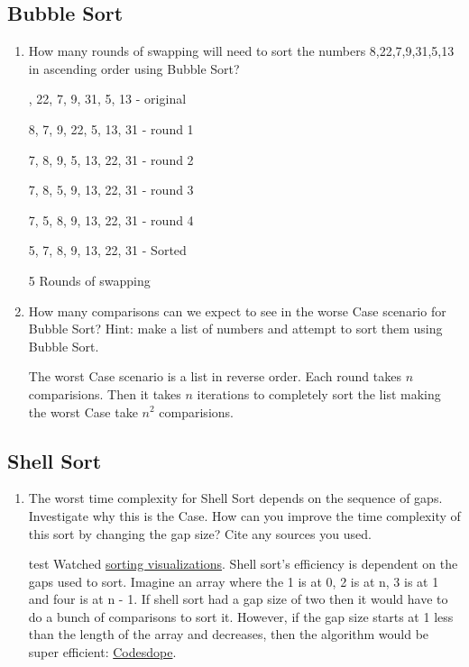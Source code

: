 \documentclass[12pt]{article}
\newenvironment{QandA}{\begin{enumerate}[label=\bfseries\alph*.]\bfseries}
{\end{enumerate}}
\newenvironment{answered}{\par\normalfont}{}
\begin{document}
    \subsection{Bubble Sort}
    \begin{QandA}

    \item How many rounds of swapping will need to sort the numbers 8,22,7,9,31,5,13 in ascending order using Bubble Sort?
        \begin{answered}
            8, 22, 7, 9, 31, 5, 13 - original

            8, 7, 9, 22, 5, 13, 31 - round 1

            7, 8, 9, 5, 13, 22, 31 - round 2

            7, 8, 5, 9, 13, 22, 31 - round 3

            7, 5, 8, 9, 13, 22, 31 - round 4

            5, 7, 8, 9, 13, 22, 31 - Sorted

            5 Rounds of swapping
        \end{answered}

    \item How many comparisons can we expect to see in the worse Case scenario for Bubble Sort? Hint: make a list of numbers and attempt to sort them using Bubble Sort.

        \begin{answered}
            The worst Case scenario is a list in reverse order. Each round takes $n$ comparisions. Then it takes $n$ iterations to completely sort the list making the worst Case take $n^2$ comparisions.
        \end{answered}
    \end{QandA}

    \subsection{Shell Sort}
    \begin{QandA}

    \item The worst time complexity for Shell Sort depends on the sequence of gaps. Investigate why this is the Case. How can you improve the time complexity of this sort by changing the gap size? Cite any sources you used.
        \begin{answered}
            test Watched \href{https://www.youtube.com/watch?v=NYWEM7H3iYc\&t=269s}{sorting visualizations}. Shell sort's efficiency is dependent on the gaps used to sort. Imagine an array where the 1 is at 0, 2 is at n, 3 is at 1 and four is at n - 1. If shell sort had a gap size of two then it would have to do a bunch of comparisons to sort it. However, if the gap size starts at 1 less than the length of the array and decreases, then the algorithm would be super efficient: \href{https://www.codesdope.com/blog/article/shell-sort/}{Codesdope}.
        \end{answered}

    \end{QandA}
\end{document}

